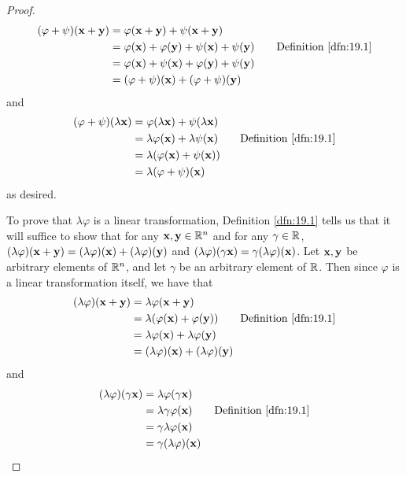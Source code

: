 \documentclass[../main.tex]{subfiles}
\begin{document}
\begin{exercise}
\begin{enumerate}[label={(\alph*)}]
\begin{proof}
            \begin{align*}
                (\varphi+\psi)(\x+\y) &= \varphi(\x+\y)+\psi(\x+\y)\\
                &= \varphi(\x)+\varphi(\y)+\psi(\x)+\psi(\y)\tag*{Definition \ref{dfn:19.1}}\\
                &= \varphi(\x)+\psi(\x)+\varphi(\y)+\psi(\y)\\
                &= (\varphi+\psi)(\x)+(\varphi+\psi)(\y)
            \end{align*}
            and
            \begin{align*}
                (\varphi+\psi)(\lambda\x) &= \varphi(\lambda\x)+\psi(\lambda\x)\\
                &= \lambda\varphi(\x)+\lambda\psi(\x)\tag*{Definition \ref{dfn:19.1}}\\
                &= \lambda(\varphi(\x)+\psi(\x))\\
                &= \lambda(\varphi+\psi)(\x)
            \end{align*}
            as desired.\par\smallskip
            To prove that $\lambda\varphi$ is a linear transformation, Definition \ref{dfn:19.1} tells us that it will suffice to show that for any $\mathbf{x},\mathbf{y}\in\mathbb{R}^n$ and for any $\gamma\in\mathbb{R}$, $(\lambda\varphi)(\mathbf{x}+\mathbf{y})=(\lambda\varphi)(\mathbf{x})+(\lambda\varphi)(\mathbf{y})$ and $(\lambda\varphi)(\gamma\mathbf{x})=\gamma(\lambda\varphi)(\mathbf{x})$. Let $\mathbf{x},\mathbf{y}$ be arbitrary elements of $\mathbb{R}^n$, and let $\gamma$ be an arbitrary element of $\mathbb{R}$. Then since $\varphi$ is a linear transformation itself, we have that
            \begin{align*}
                (\lambda\varphi)(\x+\y) &= \lambda\varphi(\x+\y)\\
                &= \lambda(\varphi(\x)+\varphi(\y))\tag*{Definition \ref{dfn:19.1}}\\
                &= \lambda\varphi(\x)+\lambda\varphi(\y)\\
                &= (\lambda\varphi)(\x)+(\lambda\varphi)(\y)
            \end{align*}
            and
            \begin{align*}
                (\lambda\varphi)(\gamma\x) &= \lambda\varphi(\gamma\x)\\
                &= \lambda\gamma\varphi(\x)\tag*{Definition \ref{dfn:19.1}}\\
                &= \gamma\lambda\varphi(\x)\\
                &= \gamma(\lambda\varphi)(\x)

\end{align*}
\end{proof}
\end{enumerate}
\end{exercise}
\end{document}

